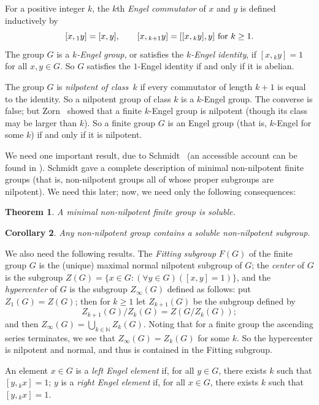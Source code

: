 \documentclass[reqno,12pt]{amsart}
\theoremstyle{plain}
\newtheorem{thm}{Theorem}[section]
\newtheorem{cor}[thm]{Corollary}
\theoremstyle{definition}
\begin{document}
For a positive integer $k$, the $k$th \emph{Engel commutator} of $x$ and $y$ is
defined inductively by
\[[x,{}_1y]=[x,y],\qquad[x,{}_{k+1}y]=[[x,{}_ky],y]\hbox{ for $k\ge1$}.\]
The group $G$ is a \emph{$k$-Engel group}, or satisfies the \emph{$k$-Engel
identity}, if $[x,{}_ky]=1$ for all $x,y\in G$. So $G$ satisfies the $1$-Engel
identity if and only if it is abelian.

The group $G$ is \emph{nilpotent of class~$k$} if every commutator of length
$k+1$ is equal to the identity. So a nilpotent group of class $k$ is a
$k$-Engel group. The converse is false; but Zorn~\cite{zorn} showed that a
finite $k$-Engel group is nilpotent (though its class may be larger than $k$).
So a finite group $G$ is an Engel group (that is, $k$-Engel for some $k$) if
and only if it is nilpotent.

We need one important result, due to Schmidt~\cite{schmidt} (an accessible
account can be found in \cite{ber}). Schmidt gave a complete description of
minimal non-nilpotent finite groups (that is, non-nilpotent groups all of whose
proper subgroups are nilpotent). We need this later; now, we need only the following consequences:

\begin{thm}
A minimal non-nilpotent finite group is soluble.
\end{thm}

\begin{cor}
Any non-nilpotent group contains a soluble non-nilpotent subgroup.
\label{c:nn}
\end{cor}

We also need the following results. The \emph{Fitting subgroup} $F(G)$ of the
finite group $G$ is the (unique) maximal normal nilpotent subgroup of $G$;
the \emph{center} of $G$ is the subgroup
$Z(G)=\{x\in G:(\forall y\in G)([x,y]=1)\}$, and the \emph{hypercenter} of $G$
is the subgroup $Z_\infty(G)$ defined as follows: put $Z_1(G)=Z(G)$; then for
$k\ge1$ let $Z_{k+1}(G)$ be the subgroup defined by
\[Z_{k+1}(G)/Z_k(G)=Z(G/Z_k(G));\]
and then $Z_\infty(G)=\bigcup_{k\in\mathbb{N}}Z_k(G)$. Noting that for a
finite group the ascending series terminates, we see that $Z_\infty(G)=Z_k(G)$
for some $k$. So the hypercenter is nilpotent and normal, and thus is
contained in the Fitting subgroup.

An element $x\in G$ is a \emph{left Engel element} if, for all
$y\in G$, there exists $k$ such that $[y,{}_kx]=1$; $y$ is a \emph{right Engel
element} if, for all $x\in G$, there exists $k$ such that $[y,{}_kx]=1$.
\end{document}
